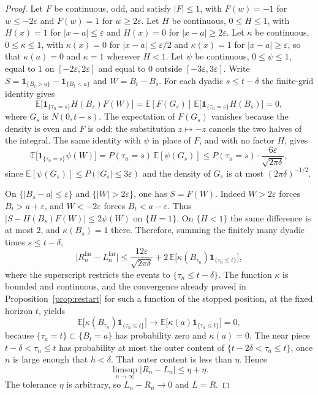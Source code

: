 \begin{proof}
Let $F$ be continuous, odd, and satisfy $|F|\le1$, with $F(w)=-1$ for $w\le-2\varepsilon$ and $F(w)=1$ for $w\ge2\varepsilon$. Let $H$ be continuous, $0\le H\le1$, with $H(x)=1$ for $|x-a|\le\varepsilon$ and $H(x)=0$ for $|x-a|\ge2\varepsilon$. Let $\kappa$ be continuous, $0\le\kappa\le1$, with $\kappa(x)=0$ for $|x-a|\le\varepsilon/2$ and $\kappa(x)=1$ for $|x-a|\ge\varepsilon$, so that $\kappa(a)=0$ and $\kappa=1$ wherever $H<1$. Let $\psi$ be continuous, $0\le\psi\le1$, equal to $1$ on $[-2\varepsilon,2\varepsilon]$ and equal to $0$ outside $[-3\varepsilon,3\varepsilon]$. Write $S=\mathbf1_{\{B_t>a\}}-\mathbf1_{\{B_t<a\}}$ and $W=B_t-B_s$. For each dyadic $s\le t-\delta$ the finite-grid identity gives
\[
 \mathbb E\bigl[\mathbf1_{\{\tau_n=s\}}H(B_s)F(W)\bigr]
 =\mathbb E[F(G_s)]\,\mathbb E\bigl[\mathbf1_{\{\tau_n=s\}}H(B_s)\bigr]=0,
\]
where $G_s$ is $N(0,t-s)$. The expectation of $F(G_s)$ vanishes because the density is even and $F$ is odd: the substitution $z\mapsto-z$ cancels the two halves of the integral. The same identity with $\psi$ in place of $F$, and with no factor $H$, gives
\[
 \mathbb E\bigl[\mathbf1_{\{\tau_n=s\}}\psi(W)\bigr]
 =P(\tau_n=s)\,\mathbb E[\psi(G_s)]
 \le P(\tau_n=s)\cdot\frac{6\varepsilon}{\sqrt{2\pi\delta}},
\]
since $\mathbb E[\psi(G_s)]\le P(|G_s|\le3\varepsilon)$ and the density of $G_s$ is at most $(2\pi\delta)^{-1/2}$.

On $\{|B_s-a|\le\varepsilon\}$ and $\{|W|>2\varepsilon\}$, one has $S=F(W)$. Indeed $W>2\varepsilon$ forces $B_t>a+\varepsilon$, and $W<-2\varepsilon$ forces $B_t<a-\varepsilon$. Thus $|S-H(B_s)F(W)|\le 2\psi(W)$ on $\{H=1\}$. On $\{H<1\}$ the same difference is at most $2$, and $\kappa(B_s)=1$ there. Therefore, summing the finitely many dyadic times $s\le t-\delta$,
\[
 \bigl|R_n^{\mathrm{far}}-L_n^{\mathrm{far}}\bigr|
 \le\frac{12\varepsilon}{\sqrt{2\pi\delta}}
 +2\,\mathbb E\bigl[\kappa(B_{\tau_n})\mathbf1_{\{\tau_n\le t\}}\bigr],
\]
where the superscript restricts the events to $\{\tau_n\le t-\delta\}$. The function $\kappa$ is bounded and continuous, and the convergence already proved in Proposition~\ref{prop:restart} for such a function of the stopped position, at the fixed horizon $t$, yields
\[
 \mathbb E\bigl[\kappa(B_{\tau_n})\mathbf1_{\{\tau_n\le t\}}\bigr]
 \to\mathbb E\bigl[\kappa(a)\mathbf1_{\{\tau_a\le t\}}\bigr]=0,
\]
because $\{\tau_a=t\}\subset\{B_t=a\}$ has probability zero and $\kappa(a)=0$. The near piece $t-\delta<\tau_n\le t$ has probability at most the outer content of $\{t-2\delta<\tau_a\le t\}$, once $n$ is large enough that $h<\delta$. That outer content is less than $\eta$. Hence
\[
 \limsup_{n\to\infty}|R_n-L_n|
 \le\eta+\eta.
\]
The tolerance $\eta$ is arbitrary, so $L_n-R_n\to0$ and $L=R$.


\end{proof}
